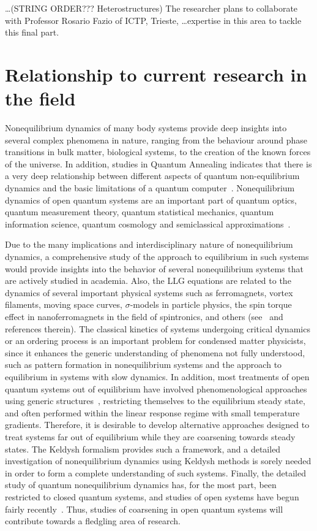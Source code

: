 \documentclass[a4paper,11pt,color]{article}
\begin{document}
\dots (STRING ORDER??? Heterostructures)
The researcher plans to collaborate with Professor Rosario Fazio of ICTP, Trieste, \dots expertise in this area to tackle this final part.

\section{Relationship to current research in the field}
\label{sec:originality}
Nonequilibrium dynamics of many body systems provide deep insights into several complex phenomena in nature, ranging from the behaviour around phase transitions in bulk matter, biological systems,  to the creation of the known forces of the universe. In addition, studies in Quantum Annealing indicates that there is a very deep relationship between different aspects of quantum non-equilibrium dynamics and the basic limitations of a quantum computer~\cite{annealing}. Nonequilibrium dynamics of open quantum systems are an important part of quantum optics, quantum measurement theory, quantum statistical mechanics, quantum information science, quantum cosmology and semiclassical approximations~\cite{openq}. 

Due to the many implications and interdisciplinary nature of nonequilibrium dynamics, a comprehensive study of the approach to equilibrium in such systems would provide insights into the behavior of several nonequilibrium systems that are actively studied in academia. Also, the LLG equations are related to the dynamics of several important physical systems such as ferromagnets, vortex filaments, moving space curves, $\sigma$-models in particle physics, the spin torque effect in 
nanoferromagnets in the field of spintronics, and others (see~\cite{gll:review} and references therein). The classical kinetics of systems undergoing critical dynamics or an ordering process is an important problem for condensed matter physicists, since it enhances the generic understanding of phenomena not fully understood, such as pattern formation in nonequilibrium systems and the approach to equilibrium in systems with slow dynamics. In addition, most treatments of open quantum systems out of equilibrium have involved phenomenological approaches using generic structures~\cite{openspin}, restricting  themselves to the equilibrium steady state, and often performed within the linear response regime with small temperature gradients. Therefore, it is desirable to develop alternative approaches designed to treat systems far out of equilibrium while they are coarsening towards steady states. The Keldysh formalism provides such a framework, and a detailed investigation of nonequilibrium dynamics using Keldysh 
methods is sorely needed in order to form a complete understanding of such systems. Finally, the detailed study of quantum nonequilibrium dynamics has, for the most part, been restricted to closed quantum systems, and studies of open systems have begun fairly recently~\cite{daley}. Thus, studies of coarsening in open quantum systems will contribute towards a fledgling area of research. 
\end{document}
